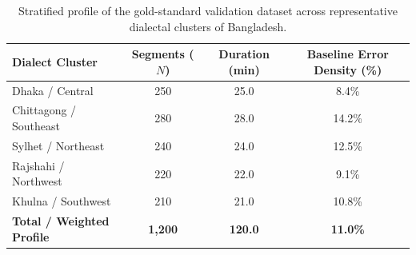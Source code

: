 
\begin{table}[t]
\centering
\small
\begin{tabular}{lccc}
\toprule
\textbf{Dialect Cluster} & \textbf{Segments ($N$)} & \textbf{Duration (min)} & \textbf{Baseline Error Density (\%)} \\
\midrule
Dhaka / Central & 250 & 25.0 & 8.4\% \\
Chittagong / Southeast & 280 & 28.0 & 14.2\% \\
Sylhet / Northeast & 240 & 24.0 & 12.5\% \\
Rajshahi / Northwest & 220 & 22.0 & 9.1\% \\
Khulna / Southwest & 210 & 21.0 & 10.8\% \\
\midrule
\textbf{Total / Weighted Profile} & \textbf{1,200} & \textbf{120.0} & \textbf{11.0\%} \\
\bottomrule
\end{tabular}
\caption{Stratified profile of the gold-standard validation dataset across representative dialectal clusters of Bangladesh.}
\label{tab:dataset_profile}
\end{table}
